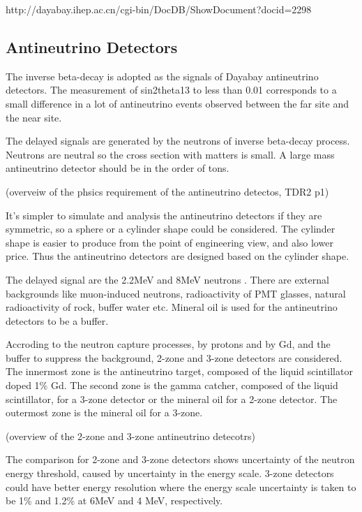 http://dayabay.ihep.ac.cn/cgi-bin/DocDB/ShowDocument?docid=2298

\subsection{Antineutrino Detectors}

The inverse beta-decay is adopted as the signals of Dayabay antineutrino detectors.
The measurement of sin2theta13 to less than 0.01 corresponds to a small
difference in a lot of antineutrino events observed between the far site and
the near site.

The delayed signals are generated by the neutrons of inverse beta-decay process.
Neutrons are neutral so the cross section with matters is small.
A large mass antineutrino detector should be in the order of tons.



(overveiw of the phsics requirement of the antineutrino detectos, TDR2 p1)

It's simpler to simulate and analysis the antineutrino detectors if they are
symmetric, so a sphere or a cylinder shape could be considered. The cylinder
shape is easier to produce from the point of engineering view, and also lower
price. Thus the antineutrino detectors are designed based on the cylinder shape.

The delayed signal are the 2.2MeV and 8MeV neutrons . There are external backgrounds like
muon-induced neutrons, radioactivity of PMT glasses, natural radioactivity of rock,
buffer water etc. Mineral oil is used for the antineutrino detectors to be a buffer.

Accroding to the neutron capture processes, by protons and by Gd, and the buffer to
suppress the background, 2-zone and 3-zone detectors are considered. The innermost
zone is the antineutrino target, composed of the liquid scintillator doped 1\% Gd.
The second zone is the gamma catcher, composed of the liquid scintillator, for a
3-zone detector or the mineral oil for a 2-zone detector. The outermost zone
is the mineral oil for a 3-zone.

(overview of the 2-zone and 3-zone antineutrino detecotrs)


The comparison for 2-zone and 3-zone detectors shows 
uncertainty of the neutron energy threshold, caused by uncertainty in the energy scale.
3-zone detectors could have better energy resolution where the energy scale
uncertainty is taken to be 1\% and 1.2\% at 6MeV and 4 MeV, respectively.

